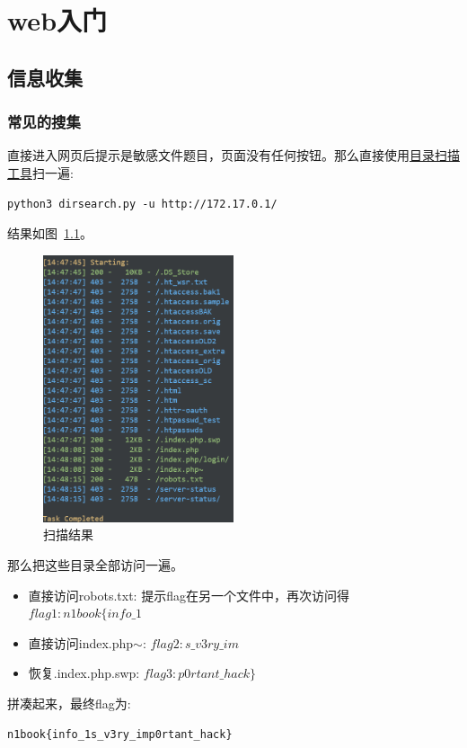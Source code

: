 \chapter{web入门}
\section{信息收集}
\subsection{常见的搜集}
直接进入网页后提示是敏感文件题目，页面没有任何按钮。那么直接使用\href{https://github.com/maurosoria/dirsearch}{目录扫描工具}扫一遍:
\begin{lstlisting}
python3 dirsearch.py -u http://172.17.0.1/
\end{lstlisting}
结果如图~\ref{fig:pic1}。
\begin{figure}[H]
\centering
\includegraphics[width=0.5\textwidth]{1-web_junior/pic/1.jpg}
\caption{扫描结果}
\label{fig:pic1}
\end{figure}
那么把这些目录全部访问一遍。
\begin{itemize}
    \item 直接访问robots.txt: 提示flag在另一个文件中，再次访问得$ flag1:n1book\{info\_1 $
    \item 直接访问index.php$\sim$: $ flag2:s\_v3ry\_im $
    \item 恢复.index.php.swp: $ flag3:p0rtant\_hack\} $
\end{itemize}
拼凑起来，最终flag为:
\begin{lstlisting}
n1book{info_1s_v3ry_imp0rtant_hack}
\end{lstlisting}

